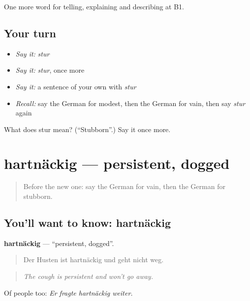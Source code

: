 \begin{grammarlens}[title={What you've built}]
One more word for telling, explaining and describing at B1.
\end{grammarlens}

\subsection*{Your turn}
\begin{itemize}
\raggedright
  \item \emph{Say it:} \emph{stur}
  \item \emph{Say it:} \emph{stur}, once more
  \item \emph{Say it:} a sentence of your own with \emph{stur}
  \item \emph{Recall:} say the German for modest, then the German for vain, then say \emph{stur} again
\end{itemize}

\begin{tcolorbox}[breakable,colback=teal!4,colframe=teal!35!black,title={Before you move on}]
What does stur mean? (\textquotedblleft{}Stubborn\textquotedblright{}.) Say it once more.
\end{tcolorbox}
\section[hartnäckig]{hartnäckig — persistent, dogged}

\label{lesson:GE-C476-hartnaeckig}



\begin{quote}
Before the new one: say the German for vain, then the German for stubborn.
\end{quote}

\subsection*{You'll want to know: hartnäckig}
\textbf{hartnäckig} — \textquotedblleft{}persistent, dogged\textquotedblright{}.

\begin{quote}
Der Husten ist hartnäckig und geht nicht weg.
\end{quote}

\begin{quote}
\emph{The cough is persistent and won't go away.}
\end{quote}

Of people too: \emph{Er fragte hartnäckig weiter.}


